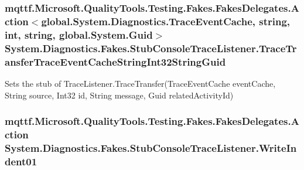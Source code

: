 \hypertarget{class_system_1_1_diagnostics_1_1_fakes_1_1_stub_console_trace_listener_a8933685742eae97ed6da8206eb9eb3ed}{
\subsubsection[{Trace\-Transfer\-Trace\-Event\-Cache\-String\-Int32\-String\-Guid}]{\setlength{\rightskip}{0pt plus 5cm}mqttf.\-Microsoft.\-Quality\-Tools.\-Testing.\-Fakes.\-Fakes\-Delegates.\-Action$<$global.\-System.\-Diagnostics.\-Trace\-Event\-Cache, string, int, string, global.\-System.\-Guid$>$ System.\-Diagnostics.\-Fakes.\-Stub\-Console\-Trace\-Listener.\-Trace\-Transfer\-Trace\-Event\-Cache\-String\-Int32\-String\-Guid}}\label{class_system_1_1_diagnostics_1_1_fakes_1_1_stub_console_trace_listener_a8933685742eae97ed6da8206eb9eb3ed}


Sets the stub of Trace\-Listener.\-Trace\-Transfer(\-Trace\-Event\-Cache event\-Cache, String source, Int32 id, String message, Guid related\-Activity\-Id)

\hypertarget{class_system_1_1_diagnostics_1_1_fakes_1_1_stub_console_trace_listener_aab8718be0e682706b76f757c57e13164}{
\subsubsection[{Write\-Indent01}]{\setlength{\rightskip}{0pt plus 5cm}mqttf.\-Microsoft.\-Quality\-Tools.\-Testing.\-Fakes.\-Fakes\-Delegates.\-Action System.\-Diagnostics.\-Fakes.\-Stub\-Console\-Trace\-Listener.\-Write\-Indent01}}\label{class_system_1_1_diagnostics_1_1_fakes_1_1_stub_console_trace_listener_aab8718be0e682706b76f757c57e13164}


